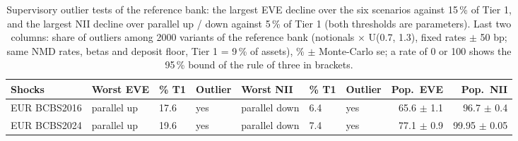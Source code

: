 \begin{table}[H]
\centering
\scriptsize
\caption{Supervisory outlier tests of the reference bank: the largest EVE decline over the six scenarios against 15\,\% of Tier 1, and the largest NII decline over parallel up / down against 5\,\% of Tier 1 (both thresholds are parameters). Last two columns: share of outliers among 2000 variants of the reference bank (notionals $\times$ U(0.7, 1.3), fixed rates $\pm$ 50 bp; same NMD rates, betas and deposit floor, Tier 1 = 9\,\% of assets), \% $\pm$ Monte-Carlo se; a rate of 0 or 100 shows the 95\,\% bound of the rule of three in brackets.}
\label{tab:R2_outlier_test}
\setlength{\tabcolsep}{3pt}
\begin{tabular}{lllllllrr}
\toprule
Shocks & Worst EVE & \% T1 & Outlier & Worst NII & \% T1 & Outlier & Pop.\ EVE & Pop.\ NII \\
\midrule
EUR BCBS2016 & parallel up & 17.6 & yes & parallel down & 6.4 & yes & 65.6 $\pm$ 1.1 & 96.7 $\pm$ 0.4 \\
EUR BCBS2024 & parallel up & 19.6 & yes & parallel down & 7.4 & yes & 77.1 $\pm$ 0.9 & 99.95 $\pm$ 0.05 \\
\bottomrule
\end{tabular}
\end{table}
